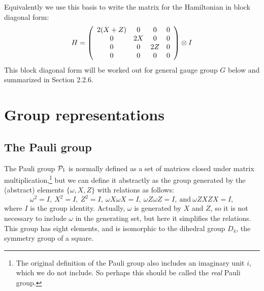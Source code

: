 Equivalently we use this basis to 
write the matrix for the Hamiltonian in
block diagonal form:
$$
H = 
\left( \begin{array}{cccc}
2(X+Z) & 0 & 0 & 0 \\
0  & 2X & 0 & 0 \\
0  & 0 & 2Z & 0 \\
0  & 0 & 0 & 0 \\
\end{array} \right) \otimes I
$$
This block diagonal form will be worked out for
general gauge group $G$ below and summarized in Section 2.2.6.


\section{Group representations}\label{GroupReps}

\subsection{The Pauli group}

The Pauli group $\mathcal{P}_1$ is normally 
defined as a set of matrices closed under
matrix multiplication,\footnote{The original definition of the Pauli
group also includes an imaginary unit $i$, which we
do not include. So perhaps this should be called the
\emph{real} Pauli group.}
but we can define it abstractly
as the group generated
by the (abstract) elements $\{\omega, X, Z\}$ with
relations as follows:
$$
\omega^2=I,\ X^2=I,\ Z^2=I,\ \omega X\omega X=I,\ \omega Z\omega Z=I,\ \mbox{and}\  \omega ZXZX=I,
$$
where $I$ is the group identity.
Actually, $\omega $ is generated by $X$ and $Z$,
so it is not necessary to include $\omega $ in the generating set,
but here it simplifies the relations.
This group has eight elements, and is isomorphic to the dihedral group $D_4$,
the symmetry group of a square.

